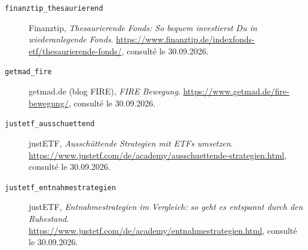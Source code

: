 \begin{description}
\item[\texttt{finanztip\_thesaurierend}] \label{presse:finanztip_thesaurierend} Finanztip, \textit{Thesaurierende Fonds: So bequem investierst Du in wiederanlegende Fonds}. \url{https://www.finanztip.de/indexfonds-etf/thesaurierende-fonds/}, consulté le 30.09.2026.
\item[\texttt{getmad\_fire}] \label{presse:getmad_fire} getmad.de (blog FIRE), \textit{FIRE Bewegung}. \url{https://www.getmad.de/fire-bewegung/}, consulté le 30.09.2026.
\item[\texttt{justetf\_ausschuettend}] \label{presse:justetf_ausschuettend} justETF, \textit{Ausschüttende Strategien mit ETFs umsetzen}. \url{https://www.justetf.com/de/academy/ausschuettende-strategien.html}, consulté le 30.09.2026.
\item[\texttt{justetf\_entnahmestrategien}] \label{presse:justetf_entnahmestrategien} justETF, \textit{Entnahmestrategien im Vergleich: so geht es entspannt durch den Ruhestand}. \url{https://www.justetf.com/de/academy/entnahmestrategien.html}, consulté le 30.09.2026.
\end{description}
